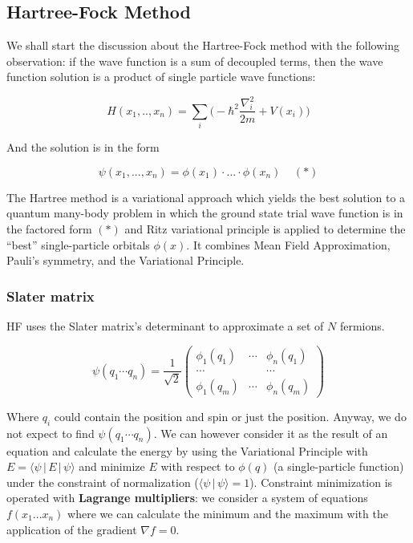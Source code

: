 	\subsection{Hartree-Fock Method}
	We shall start the discussion about the Hartree-Fock method with the following observation: if the wave function is a sum of decoupled terms, then the wave function solution is a product of single particle wave functions:

	$$H(x_1,.., x_n) = \sum_i \bigg(-\hbar^2 \frac{\nabla_i^2}{2m} + V(x_i) \bigg)$$

	And the solution is in the form

	$$\psi(x_1, ..., x_n) = \phi(x_1) \cdot ... \cdot \phi(x_n) \;\;\;\; (*)$$

	The Hartree method is a variational approach which yields the best solution to a quantum many-body problem in which the ground state trial wave function is in the factored form $(*)$ and Ritz variational principle is applied to determine the “best” single-particle orbitals $\phi(x)$.
	It combines Mean Field Approximation, Pauli's symmetry, and the Variational Principle.

		\subsubsection{Slater matrix}
		HF uses the Slater matrix's determinant to approximate a set of $N$ fermions.

		$$\psi(q_1\cdots q_n)=\frac{1}{\sqrt{2}}\begin{pmatrix}\phi_1(q_1)&\cdots&\phi_n(q_1)\\\cdots & &\cdots\\\phi_1(q_m)&\cdots&\phi_n(q_m)\end{pmatrix}$$

		Where $q_i$ could contain the position and spin or just the position. Anyway, we do not expect to find $\psi(q_1\cdots q_n)$.
		We can however consider it as the result of an equation and calculate the energy by using the Variational Principle with $E=\langle \psi\,|\,E\,|\,\psi \rangle$ and minimize $E$ with respect to $\phi(q)$ (a single-particle function) under the constraint of normalization ($\langle \psi\,|\,\psi \rangle =1$).
		Constraint minimization is operated with \textbf{Lagrange multipliers}: we consider a system of equations $f(x_1...x_n)$ where we can calculate the minimum and the maximum with the application of the gradient $\nabla f=0$.\\

